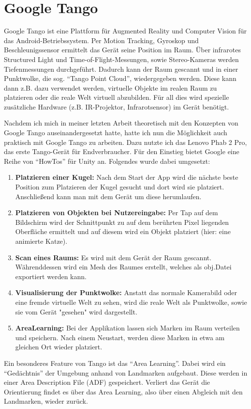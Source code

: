 
\section{Google Tango}
Google Tango ist eine Plattform für Augmented Reality und Computer Vision für das Android-Betriebssystem. Per Motion Tracking, Gyroskop und Beschleunigssensor ermittelt das Gerät seine Position im Raum. Über infrarotes Structured Light und Time-of-Flight-Messungen, sowie Stereo-Kameras werden Tiefenmessungen durchgeführt. Dadurch kann der Raum gescannt und in einer Punktwolke, die sog. "`Tango Point Cloud"', wiedergegeben werden. Diese kann dann z.B. dazu verwendet werden, virtuelle Objekte im realen Raum zu platzieren oder die reale Welt virtuell abzubilden. Für all dies wird spezielle zusätzliche Hardware (z.B. IR-Projektor, Infrarotsensor) im Gerät benötigt.\cite{fehling}

Nachdem ich mich in meiner letzten Arbeit theoretisch mit den Konzepten von Google Tango auseinandergesetzt hatte, hatte ich nun die Möglichkeit auch praktisch mit Google Tango zu arbeiten. Dazu nutzte ich das Lenovo Phab 2 Pro, das erste Tango-Gerät für Endverbraucher. Für den Einstieg bietet Google eine Reihe von "`HowTos"' für Unity an. Folgendes wurde dabei umgesetzt:
\begin{enumerate}
	\item\textbf{Platzieren einer Kugel:} Nach dem Start der App wird die nächste beste Position zum Platzieren der Kugel gesucht und dort wird sie platziert. Anschließend kann man mit dem Gerät um diese herumlaufen.
	\item\textbf{Platzieren von Objekten bei Nutzereingabe:} Per Tap auf dem Bildschirm wird der Schnittpunkt zu auf dem berührten Pixel liegenden Oberfläche ermittelt und auf diesem wird ein Objekt platziert (hier: eine animierte Katze).
	\item\textbf{Scan eines Raums:} Es wird mit dem Gerät der Raum gescannt. Währenddessen wird ein Mesh des Raumes erstellt, welches als obj.Datei exportiert werden kann.
	\item\textbf{Visualisierung der Punktwolke:} Anstatt das normale Kamerabild oder eine fremde virtuelle Welt zu sehen, wird die reale Welt als Punktwolke, sowie sie vom Gerät "gesehen" wird dargestellt.
	\item\textbf{AreaLearning:} Bei der Applikation lassen sich Marken im Raum verteilen und speichern. Nach einem Neustart, werden diese Marken in etwa am gleichen Ort wieder platziert.
\end{enumerate}
Ein besonderes Feature von Tango ist das "`Area Learning"'. Dabei wird ein "`Gedächtnis"' der Umgebung anhand von Landmarken aufgebaut. Diese werden in einer Area Description File (ADF) gespeichert. Verliert das Gerät die Orientierung findet es über das Area Learning, also über einen Abgleich mit den Landmarken, wieder zurück.\cite{fehling}

